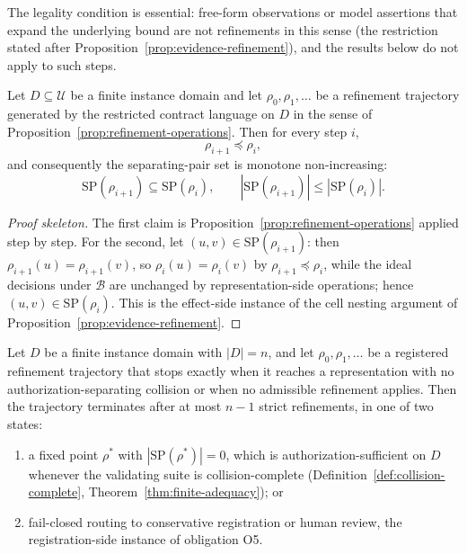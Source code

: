 The legality condition is essential: free-form observations or model
assertions that expand the underlying bound are not refinements in this sense
(the restriction stated after Proposition~\ref{prop:evidence-refinement}), and
the results below do not apply to such steps.

\begin{theorem}
\label{thm:refinement-order}
Let $D\subseteq\mathcal{U}$ be a finite instance domain and let
$\rho_0,\rho_1,\ldots$ be a refinement trajectory generated by the restricted
contract language on $D$ in the sense of
Proposition~\ref{prop:refinement-operations}. Then for every step $i$,
\[
  \rho_{i+1}\preceq\rho_i,
\]
and consequently the separating-pair set is monotone non-increasing:
\[
  \mathrm{SP}(\rho_{i+1})\subseteq\mathrm{SP}(\rho_i),
  \qquad
  |\mathrm{SP}(\rho_{i+1})|\le|\mathrm{SP}(\rho_i)|.
\]
\end{theorem}

\begin{proof}[Proof skeleton]
The first claim is Proposition~\ref{prop:refinement-operations} applied step
by step. For the second, let $(u,v)\in\mathrm{SP}(\rho_{i+1})$: then
$\rho_{i+1}(u)=\rho_{i+1}(v)$, so $\rho_i(u)=\rho_i(v)$ by
$\rho_{i+1}\preceq\rho_i$, while the ideal decisions under $\mathcal{B}$ are
unchanged by representation-side operations; hence
$(u,v)\in\mathrm{SP}(\rho_i)$. This is the effect-side instance of the cell
nesting argument of Proposition~\ref{prop:evidence-refinement}.
\end{proof}

\begin{theorem}
\label{thm:refinement-termination}
Let $D$ be a finite instance domain with $|D|=n$, and let
$\rho_0,\rho_1,\ldots$ be a registered refinement trajectory that stops
exactly when it reaches a representation with no authorization-separating
collision or when no admissible refinement applies. Then the trajectory
terminates after at most $n-1$ strict refinements, in one of two states:
\begin{enumerate}
  \item a fixed point $\rho^\ast$ with $|\mathrm{SP}(\rho^\ast)|=0$, which is
        authorization-sufficient on $D$ whenever the validating suite is
        collision-complete (Definition~\ref{def:collision-complete},
        Theorem~\ref{thm:finite-adequacy}); or
  \item fail-closed routing to conservative registration or human review, the
        registration-side instance of obligation O5.
\end{enumerate}
\end{theorem}


